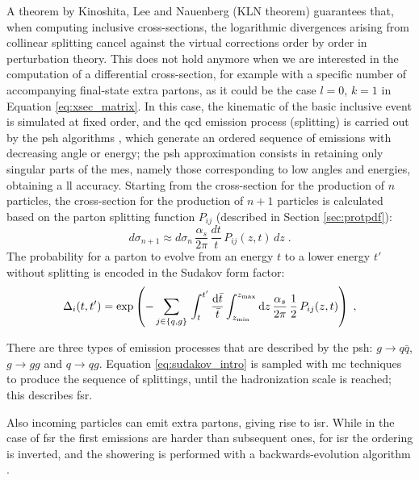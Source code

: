 A theorem by Kinoshita, Lee and Nauenberg (KLN theorem) \cite{Kinoshita:1962ur,Lee:1964is} guarantees that, 
when computing inclusive cross-sections, the logarithmic divergences arising from collinear splitting cancel against the virtual corrections order by order in perturbation theory. 
This does not hold anymore when we are interested in the computation of a differential cross-section, for example with a specific number of accompanying final-state extra partons, 
as it could be the case $l=0$, $k=1$ in Equation \ref{eq:xsec_matrix}. 
In this case, the kinematic of the basic inclusive event is simulated at fixed order, and the \gls{qcd} emission process (splitting) is carried out by the \gls{psh} algorithms \cite{Fox:1979ag}, which generate an ordered sequence of emissions with decreasing angle or energy; the \gls{psh} approximation consists in retaining only singular parts of the \glspl{me}, namely those corresponding to low angles and energies, obtaining a \gls{ll} accuracy.
Starting from the cross-section for the production of $n$ particles, the cross-section for the production 
of $n+1$ particles is calculated based on the parton splitting function $P_{ij}$ (described in Section \ref{sec:protpdf}):
\begin{equation}
d\sigma_{n+1} \approx d\sigma_n \, \frac{ \alpha_s }{2 \pi } \, \frac{dt}{t}  \,  P_{ij}(z, t) \, dz \; . \nonumber
\end{equation}
The probability for a parton to evolve from an energy $t$ to a lower energy $t'$ without splitting is encoded in the Sudakov form factor:
\begin{equation}
  \Delta_i(t,t')=\exp\left(-\sum_{j\in\{q,g\}}\,
  \int_t^{t'}\frac{{\rm{d}}\bar{t}}{\bar{t}}\int_{z_{\rm min}}^{z_{\rm max}}{\rm{d}} z\,
  \frac{ \alpha_s }{2 \pi } \, \frac{1}{2} \, P_{ij}(z, t) \right) \;,
  \label{eq:sudakov_intro}
\end{equation}

There are three types of emission processes that are described by the \gls{psh}: $g \rightarrow q\bar{q}$, $g \rightarrow gg$ and $q \rightarrow q g$.
Equation \ref{eq:sudakov_intro} is sampled with \gls{mc} techniques to produce the sequence of splittings, until the hadronization scale is reached;
this describes \gls{fsr}.

Also incoming particles can emit extra partons, giving rise to \gls{isr}. 
While in the case of \gls{fsr} the first emissions are harder than subsequent ones, 
for \gls{isr} the ordering is inverted, and the showering is performed with a backwards-evolution algorithm \cite{Sjostrand:1985xi}.

